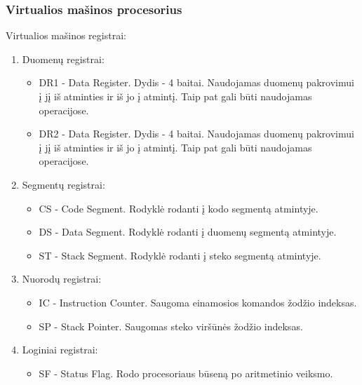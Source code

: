 	\subsubsection{Virtualios mašinos procesorius}
	Virtualios mašinos registrai:
	\begin{enumerate}
	\item Duomenų registrai: 
		\begin{itemize}
		\item DR1 - Data Register. Dydis - 4 baitai. Naudojamas duomenų pakrovimui į jį iš atminties ir iš jo į atmintį. Taip pat gali būti naudojamas operacijose.
		\item DR2 - Data Register. Dydis - 4 baitai. Naudojamas duomenų pakrovimui į jį iš atminties ir iš jo į atmintį. Taip pat gali būti naudojamas operacijose.
		\end{itemize}
	\item Segmentų registrai:
		\begin{itemize}
		\item CS - Code Segment. Rodyklė rodanti į kodo segmentą atmintyje.
		\item DS - Data Segment. Rodyklė rodanti į duomenų segmentą atmintyje.
		\item ST - Stack Segment. Rodyklė rodanti į steko segmentą atmintyje.
		\end{itemize}
	\item Nuorodų registrai:
		\begin{itemize}
		\item IC - Instruction Counter. Saugoma einamosios komandos žodžio indeksas.
		\item SP - Stack Pointer. Saugomas steko viršūnės žodžio indeksas.
		\end{itemize}
	\item Loginiai registrai:
		\begin{itemize}
		\item SF - Status Flag. Rodo procesoriaus būseną po aritmetinio veiksmo.
		\end{itemize}
	\end{enumerate}
